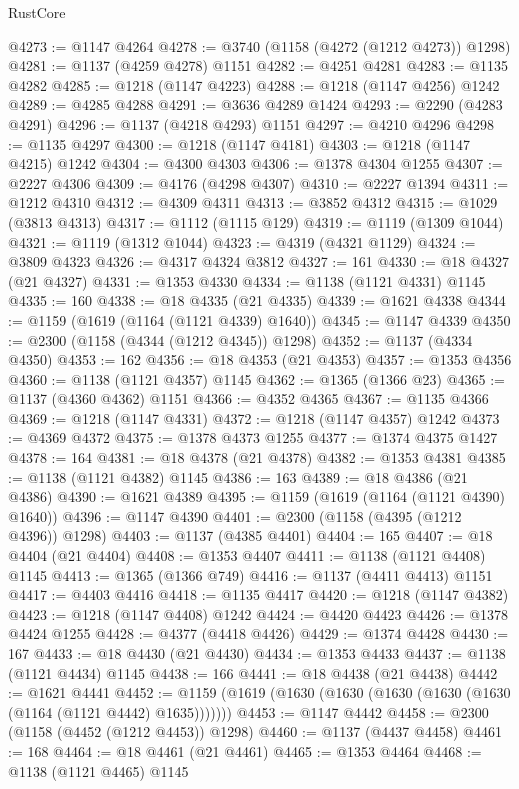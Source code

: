 \begin{lexlean}{RustCore}
\begin{coremodule}
@4273 := @1147 @4264
@4278 := @3740 (@1158 (@4272 (@1212 @4273)) @1298)
@4281 := @1137 (@4259 @4278) @1151
@4282 := @4251 @4281
@4283 := @1135 @4282
@4285 := @1218 (@1147 @4223)
@4288 := @1218 (@1147 @4256) @1242
@4289 := @4285 @4288
@4291 := @3636 @4289 @1424
@4293 := @2290 (@4283 @4291)
@4296 := @1137 (@4218 @4293) @1151
@4297 := @4210 @4296
@4298 := @1135 @4297
@4300 := @1218 (@1147 @4181)
@4303 := @1218 (@1147 @4215) @1242
@4304 := @4300 @4303
@4306 := @1378 @4304 @1255
@4307 := @2227 @4306
@4309 := @4176 (@4298 @4307)
@4310 := @2227 @1394
@4311 := @1212 @4310
@4312 := @4309 @4311
@4313 := @3852 @4312
@4315 := @1029 (@3813 @4313)
@4317 := @1112 (@1115 @129)
@4319 := @1119 (@1309 @1044)
@4321 := @1119 (@1312 @1044)
@4323 := @4319 (@4321 @1129)
@4324 := @3809 @4323
@4326 := @4317 @4324 @3812
@4327 := 161
@4330 := @18 @4327 (@21 @4327)
@4331 := @1353 @4330
@4334 := @1138 (@1121 @4331) @1145
@4335 := 160
@4338 := @18 @4335 (@21 @4335)
@4339 := @1621 @4338
@4344 := @1159 (@1619 (@1164 (@1121 @4339) @1640))
@4345 := @1147 @4339
@4350 := @2300 (@1158 (@4344 (@1212 @4345)) @1298)
@4352 := @1137 (@4334 @4350)
@4353 := 162
@4356 := @18 @4353 (@21 @4353)
@4357 := @1353 @4356
@4360 := @1138 (@1121 @4357) @1145
@4362 := @1365 (@1366 @23)
@4365 := @1137 (@4360 @4362) @1151
@4366 := @4352 @4365
@4367 := @1135 @4366
@4369 := @1218 (@1147 @4331)
@4372 := @1218 (@1147 @4357) @1242
@4373 := @4369 @4372
@4375 := @1378 @4373 @1255
@4377 := @1374 @4375 @1427
@4378 := 164
@4381 := @18 @4378 (@21 @4378)
@4382 := @1353 @4381
@4385 := @1138 (@1121 @4382) @1145
@4386 := 163
@4389 := @18 @4386 (@21 @4386)
@4390 := @1621 @4389
@4395 := @1159 (@1619 (@1164 (@1121 @4390) @1640))
@4396 := @1147 @4390
@4401 := @2300 (@1158 (@4395 (@1212 @4396)) @1298)
@4403 := @1137 (@4385 @4401)
@4404 := 165
@4407 := @18 @4404 (@21 @4404)
@4408 := @1353 @4407
@4411 := @1138 (@1121 @4408) @1145
@4413 := @1365 (@1366 @749)
@4416 := @1137 (@4411 @4413) @1151
@4417 := @4403 @4416
@4418 := @1135 @4417
@4420 := @1218 (@1147 @4382)
@4423 := @1218 (@1147 @4408) @1242
@4424 := @4420 @4423
@4426 := @1378 @4424 @1255
@4428 := @4377 (@4418 @4426)
@4429 := @1374 @4428
@4430 := 167
@4433 := @18 @4430 (@21 @4430)
@4434 := @1353 @4433
@4437 := @1138 (@1121 @4434) @1145
@4438 := 166
@4441 := @18 @4438 (@21 @4438)
@4442 := @1621 @4441
@4452 := @1159 (@1619 (@1630 (@1630 (@1630 (@1630 (@1630 (@1164 (@1121 @4442) @1635)))))))
@4453 := @1147 @4442
@4458 := @2300 (@1158 (@4452 (@1212 @4453)) @1298)
@4460 := @1137 (@4437 @4458)
@4461 := 168
@4464 := @18 @4461 (@21 @4461)
@4465 := @1353 @4464
@4468 := @1138 (@1121 @4465) @1145

\end{coremodule}
\end{lexlean}
